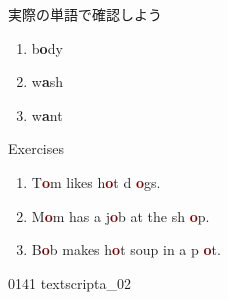 \documentclass[aspectratio=169, xcolor={dvipsnames,table}]{beamer}
\begin{document}
\begin{frame}[plain]{実際の単語で確認しよう}
\begin{enumerate}
    \item b\textcolor{NavyBlue}{\bfseries o}dy%
          \hfill
          \hspace{150pt}\mbox{}

    \item w\textcolor{NavyBlue}{\bfseries a}sh%
          \hfill
          \hspace{150pt}\mbox{}

    \item w\textcolor{NavyBlue}{\bfseries a}nt%
          \hfill
          \hspace{150pt}\mbox{}
  \end{enumerate}
\end{frame}
\begin{frame}[plain]{Exercises }
  \LARGE

  \begin{enumerate}
    \item T\textcolor{Maroon}{\bfseries o}m likes h\textcolor{Maroon}{\bfseries o}t d\textcolor{Maroon}{\bfseries
            o}gs.

    \item M\textcolor{Maroon}{\bfseries o}m has a j\textcolor{Maroon}{\bfseries o}b at the sh\textcolor{Maroon}{\bfseries
            o}p.

    \item B\textcolor{Maroon}{\bfseries o}b makes h\textcolor{Maroon}{\bfseries o}t soup in a p\textcolor{Maroon}{\bfseries
            o}t.
  \end{enumerate}

  \hfill{\tiny 0141}\,{\scriptsize {}\,{\tiny textscripta\_02}}
\end{frame}
\end{document}
